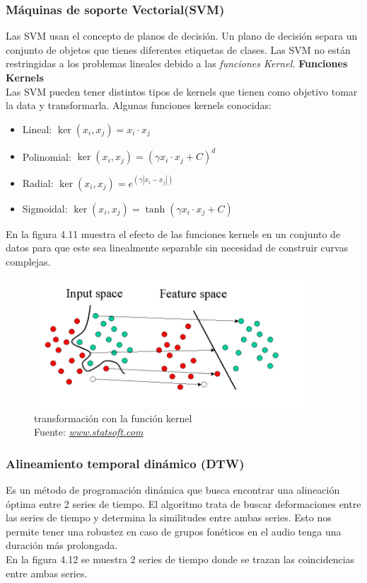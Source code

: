\subsubsection{Máquinas de soporte Vectorial(SVM)}
Las SVM usan el concepto de planos de decisión. Un plano de decisión separa un conjunto de objetos que tienes diferentes etiquetas de clases. Las SVM no están restringidas a los problemas lineales debido a las \textit{funciones Kernel.}
\textbf{Funciones Kernels}\\
Las SVM pueden tener distintos tipos de kernels que tienen como objetivo tomar la data y transformarla. Algunas funciones kernels conocidas:
\begin{itemize}
	\item Lineal: $\ker(x_{i},x_{j})= x_{i} \cdot x_{j}$
	\item Polinomial: $\ker(x_{i},x_{j})= ( \gamma x_{i} \cdot x_{j}+C)^d$
	\item Radial: $\ker(x_{i},x_{j})= e^{(\gamma |x_{i} - x_{j}|)}$
	\item Sigmoidal: $\ker(x_{i},x_{j})= \tanh ( \gamma x_{i} \cdot x_{j}+C)$
\end{itemize}
En la figura 4.11 muestra el efecto de las funciones kernels en un conjunto de datos para que este sea linealmente separable sin necesidad de construir curvas complejas.\\
\begin{figure}[H]
	\centering
	\includegraphics[width=0.9\textwidth]{Figures/svm.png}
	\caption{transformación con la función kernel \\ Fuente:  \href{http://www.statsoft.com/Textbook/Support-Vector-Machines}{\textit{www.statsoft.com}}}
	\label{transformación con la función kernel}
\end{figure} 

\subsubsection{Alineamiento temporal dinámico (DTW)}
Es un método de programación dinámica que busca encontrar una alineación óptima entre 2 series de tiempo. El algoritmo trata de buscar deformaciones entre las series de tiempo y determina la similitudes entre ambas series. Esto nos permite tener una robustez en caso de grupos fonéticos en el audio tenga una duración más prolongada.\\ En la figura 4.12 se muestra 2 series de tiempo donde se trazan las coincidencias entre ambas series.

